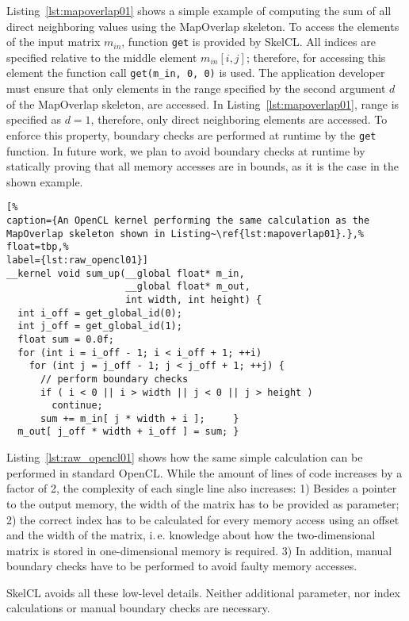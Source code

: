 Listing~\ref{lst:mapoverlap01} shows a simple example of computing the sum of all direct neighboring values using the MapOverlap skeleton.
To access the elements of the input matrix $m_{in}$, function \texttt{get} is provided by SkelCL.
All indices are specified relative to the middle element $m_{in}[i,j]$; therefore, for accessing this element the function call \texttt{get(m\_in, 0, 0)} is used.
The application developer must ensure that only elements in the range specified by the second argument $d$ of the MapOverlap skeleton, are accessed.
In Listing~\ref{lst:mapoverlap01}, range is specified as $d=1$, therefore, only direct neighboring elements are accessed.
To enforce this property, boundary checks are performed at runtime by the \texttt{get} function.
In future work, we plan to avoid boundary checks at runtime by statically proving that all memory accesses are in bounds, as it is the case in the shown example.

\begin{lstlisting}[%
caption={An OpenCL kernel performing the same calculation as the MapOverlap skeleton shown in Listing~\ref{lst:mapoverlap01}.},%
float=tbp,%
label={lst:raw_opencl01}]
__kernel void sum_up(__global float* m_in,
                     __global float* m_out,
                     int width, int height) {
  int i_off = get_global_id(0); 
  int j_off = get_global_id(1);
  float sum = 0.0f;
  for (int i = i_off - 1; i < i_off + 1; ++i)
    for (int j = j_off - 1; j < j_off + 1; ++j) {
      // perform boundary checks
      if ( i < 0 || i > width || j < 0 || j > height )
        continue;
      sum += m_in[ j * width + i ];     }
  m_out[ j_off * width + i_off ] = sum; }
\end{lstlisting}


Listing~\ref{lst:raw_opencl01} shows how the same simple calculation can be performed in standard OpenCL.
While the amount of lines of code increases by a factor of 2, the complexity of each single line also increases:
1) Besides a pointer to the output memory, the width of the matrix has to be provided as parameter; 2) the correct index has to be calculated for every memory access using an offset and the width of the matrix, i.\,e.
knowledge about how the two-dimensional matrix is stored in one-dimensional memory is required.
3) In addition, manual boundary checks have to be performed to avoid faulty memory accesses. 

SkelCL avoids all these low-level details.
Neither additional parameter, nor index calculations or manual boundary checks are necessary.

